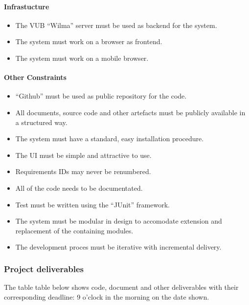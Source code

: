 \documentclass[12pt]{article}
\begin{document}
\paragraph{Infrastucture}\label{infrastucture}

\begin{itemize}
\itemsep1pt\parskip0pt
\item
  The VUB ``Wilma'' server must be used as backend for
  the system.
\item
  The system must work on a browser as frontend.
\item
  The system must work on a mobile browser.
\end{itemize}

\paragraph{Other Constraints}\label{other-constraints}

\begin{itemize}
\itemsep1pt\parskip0pt
\item
  ``Github'' must be used as public repository for
  the code.
\item
  All documents, source code and other artefacts must be publicly
  available in a structured way.
\item
  The system must have a standard, easy installation procedure.
\item
  The UI must be simple and attractive to use.
\item
  Requirements IDs may never be renumbered.
\item
  All of the code needs to be documentated.
\item
  Test must be written using the ``JUnit'' framework.
\item
  The system must be modular in design to accomodate extension and
  replacement of the containing modules.
\item
  The development proces must be iterative with incremental delivery.
\end{itemize}

\subsubsection{Project deliverables}\label{project-deliverables}

The table table below shows code, document and other deliverables with
their corresponding deadline: 9 o'clock in the morning on the date
shown.
\end{document}
